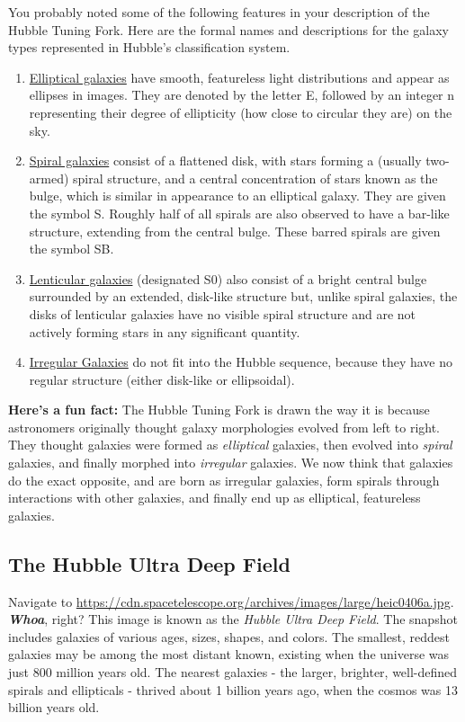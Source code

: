 \documentclass[11pt]{article}
\begin{document}
\pagebreak
\noindent
You probably noted some of the following features in your description of the Hubble Tuning Fork.  Here are the formal names and descriptions for the galaxy types represented in Hubble's classification system.

\begin{enumerate}
    \item \underline{Elliptical galaxies} have smooth, featureless light distributions and appear as ellipses in images. They are denoted by the letter E, followed by an integer n representing their degree of ellipticity (how close to circular they are) on the sky.
    \item \underline{Spiral galaxies} consist of a flattened disk, with stars forming a (usually two-armed) spiral structure, and a central concentration of stars known as the bulge, which is similar in appearance to an elliptical galaxy. They are given the symbol S. Roughly half of all spirals are also observed to have a bar-like structure, extending from the central bulge. These barred spirals are given the symbol SB.
    \item \underline{Lenticular galaxies} (designated S0) also consist of a bright central bulge surrounded by an extended, disk-like structure but, unlike spiral galaxies, the disks of lenticular galaxies have no visible spiral structure and are not actively forming stars in any significant quantity.
    \item \underline{Irregular Galaxies} do not fit into the Hubble sequence, because they have no regular structure (either disk-like or ellipsoidal). 
\end{enumerate}


\noindent
\textbf{Here's a fun fact:} The Hubble Tuning Fork is drawn the way it is because astronomers originally thought galaxy morphologies evolved from left to right.  They thought galaxies were formed as \textit{elliptical} galaxies, then evolved into \textit{spiral} galaxies, and finally morphed into \textit{irregular} galaxies.  We now think that galaxies do the exact opposite, and are born as irregular galaxies, form spirals through interactions with other galaxies, and finally end up as elliptical, featureless galaxies.

\pagebreak
\subsection{The Hubble Ultra Deep Field}

Navigate to \url{https://cdn.spacetelescope.org/archives/images/large/heic0406a.jpg}.
\\\textbf{\textit{Whoa}}, right? This image is known as the \textit{Hubble Ultra Deep Field}. The snapshot includes galaxies of various ages, sizes, shapes, and colors. The smallest, reddest galaxies may be among the most distant known, existing when the universe was just 800 million years old. The nearest galaxies - the larger, brighter, well-defined spirals and ellipticals - thrived about 1 billion years ago, when the cosmos was 13 billion years old.
\end{document}
